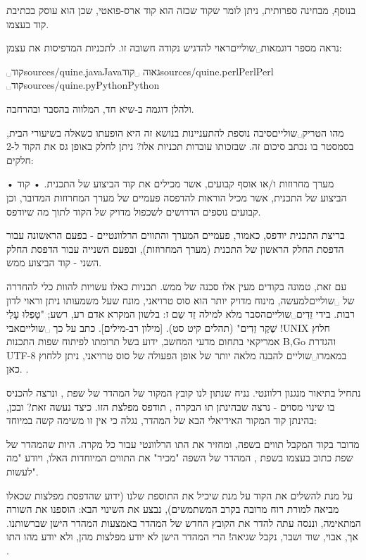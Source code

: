 בנוסף, מבחינה ספרותית, ניתן לומר שקוד שכזה הוא קוד ארס-פואטי, שכן הוא עוסק בכתיבת קוד בעצמו.

נראה מספר דוגמאות␣שוליים{ראוי להדגיש נקודה חשובה זו.} לתכניות המדפיסות את עצמן:

␣קוד{sources/quine.java}{Java}{גאוה}
␣קוד{sources/quine.perl}{Perl}{Perl}
␣קוד{sources/quine.py}{Python}{Python}

ולהלן דוגמה ב-שיא חד, המלווה בהסבר ובהרחבה.

מהו הטריק␣שוליים{סיבה נוספת להתעניינות בנושא זה היא הופעתו כשאלה בשיעורי הבית, בסמסטר בו נכתב סיכום זה.} שבזכותו עובדות תכניות אלו? ניתן לחלק באופן גס את הקוד ל-2 חלקים:
\begin{enumerate}
• מערך מחרוזות ו/או אוסף קבועים, אשר מכילים את קוד הביצוע של התכנית.
• קוד הביצוע של התכנית, אשר מכיל הוראות להדפסה פעמיים של מערך המחרוזות המדובר, וכן קבועים נוספים הדרושים לשכפול מדויק של הקוד לתוך מה שיודפס.
\end{enumerate}
בריצת התכנית יודפס, כאמור, פעמיים המערך והתווים הרלוונטיים - בפעם הראשונה עבור הדפסת החלק הראשון של התכנית (מערך המחרוזות), ובפעם השנייה עבור הדפסת החלק השני - קוד הביצוע ממש.

עם זאת, טמונה בקודים מעין אלו סכנה של ממש. תכניות כאלו עשויות להוות כלי להחדרה של ␣שוליים{למעשה, מינוח מדויק יותר הוא סוס טרויאני, מונח שעל משמעותו ניתן וראוי לדון רבות.} בידי זֵדִים␣שוליים{הסבר מלא למילה זֵד שֵם ז: בלשון המקרא אדם רע, רשע; "טָפְלוּ עָלַי שֶׁקֶר זֵדִים" (תהלים קיט סט). [מילון רב-מילים]}. כתב על כך ␣שוליים{אבי !UNIX חלוץ אמריקאי בתחום מדעי המחשב, ידוע בשל תרומתו לפיתוח שפות התכנות B,Go והגדרת UTF-8} במאמרו␣שוליים {להבנה מלאה יותר של אופן הפעולה של סוס טרויאני, ניתן ללחוץ כאן.
 }.

נתחיל בתיאור מנגנון רלוונטי. נניח שנתון לנו קובץ המקור של המהדר של שפת , ונרצה להכניס בו שינוי מסוים - נרצה שבהינתן תו הבקרה , תודפס מפלצת  הזו. כיצד נעשה זאת? ובכן, בהינתן קוד המקור האידיאלי הבא של המהדר, נגלה כי אין זו משימה קשה במיוחד:

מדובר בקוד המקבל תווים בשפה, ומחזיר את התו הרלוונטי עבור כל מקרה. היות שהמהדר של שפת  כתוב בעצמו בשפת , המהדר של השפה "מכיר" את התווים המיוחדות האלו, ויודע "מה לעשות".

על מנת להשלים את הקוד על מנת שיכיל את התוספת שלנו (ידוע שהדפסת מפלצות  שכאלו מביאה למורת רוח מרובה בקרב המשתמשים), נבצע את השינוי הבא:
הוספנו את השורה המתאימה, וננסה עתה להדר את הקובץ החדש של המהדר באמצעות המהדר הישן שברשותנו. אך, אבוי, שוד ושבר, נקבל שגיאה! הרי המהדר הישן לא יודע מפלצות  מהן, ולא יודע מהו התו .

